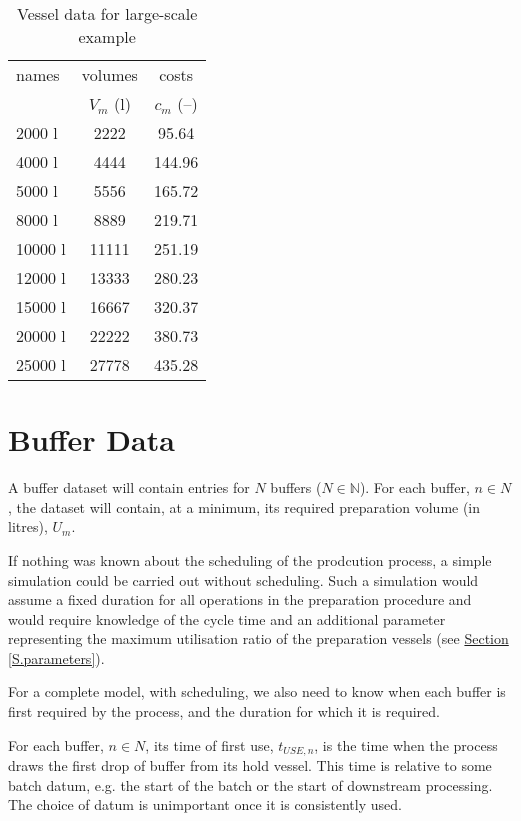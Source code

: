 \begin{table}[h!]
    \centering
    \caption{Vessel data for large-scale example}
    \label{tbl.vessel}
    \begin{tabular}{l | c | c}
        names & volumes & costs\\
        & $V_{m}$ (l) & $c_{m}$ (--)\\ \hline
        2000 l & 2222 & 95.64\\
        4000 l & 4444 & 144.96\\
        5000 l & 5556 & 165.72\\
        8000 l & 8889 & 219.71\\
        10000 l & 11111 & 251.19\\
        12000 l & 13333 & 280.23\\
        15000 l & 16667 & 320.37\\
        20000 l & 22222 & 380.73\\
        25000 l & 27778 & 435.28\\
    \end{tabular}
\end{table}

\section{Buffer Data}\label{S.bufferdata}

A buffer dataset will contain entries for $N$ buffers ($N \in \mathbb{N}$).
For each buffer, $n \in N$, the dataset will contain, at a minimum, its
required preparation volume (in litres), $U_{m}$.

If nothing was known about the scheduling of the prodcution process, a simple
simulation could be carried out without scheduling.
Such a simulation would assume a fixed duration for all operations in the 
preparation procedure and would require knowledge of the cycle time and an
additional parameter representing the maximum utilisation ratio of the
preparation vessels (see \hyperref[S.parameters]{Section \ref*{S.parameters}}).

For a complete model, with scheduling, we also need to know when each buffer
is first required by the process, and the duration for which it is required.

For each buffer, $n \in N$, its time of first use, $t_{USE,n}$, is the time
when the process draws the first drop of buffer from its hold vessel.
This time is relative to some batch datum, e.g. the start of the batch or the
start of downstream processing.
The choice of datum is unimportant once it is consistently used.

